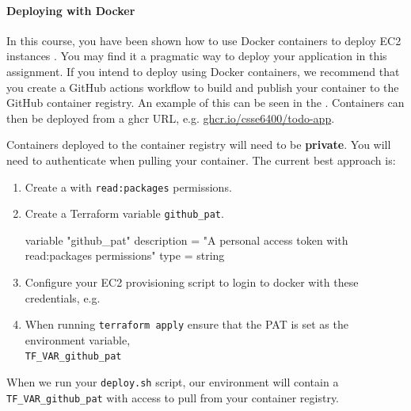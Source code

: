 \documentclass{csse4400}
\begin{document}

\paragraph{Deploying with Docker}
In this course,
you have been shown how to use Docker containers to deploy EC2 instances \cite{prac-week5}.
You may find it a pragmatic way to deploy your application in this assignment.
If you intend to deploy using Docker containers,
we recommend that you create a GitHub actions workflow
to build and publish your container to the GitHub container registry.
An example of this can be seen in the .
Containers can then be deployed from a ghcr URL, e.g. \url{ghcr.io/csse6400/todo-app}.

Containers deployed to the container registry will need to be \textbf{private}.
You will need to authenticate when pulling your container.
The current best approach is:

\begin{enumerate}
  \item Create a  with \texttt{read:packages} permissions.
  \item Create a Terraform variable \texttt{github\_pat}.
\begin{code}[language=terraform]{}
variable "github_pat" {
    description = "A personal access token with read:packages permissions"
    type        = string
}
\end{code}
  \item Configure your EC2 provisioning script to login to docker with these credentials, e.g.
  \item When running \texttt{terraform apply} ensure that the PAT is set as the environment variable,\\
  \texttt{TF\_VAR\_github\_pat}
\end{enumerate}

When we run your \texttt{deploy.sh} script,
our environment will contain a \texttt{TF\_VAR\_github\_pat} with access to pull from your container registry.


\end{document}
